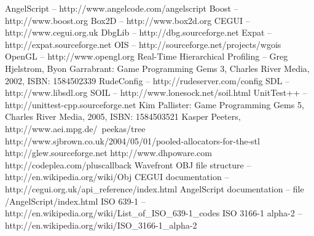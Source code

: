\documentclass[a4paper, 12pt]{report}
\begin{document}
\begin{thebibliography}{9}
AngelScript -- http://www.angelcode.com/angelscript
Boost -- http://www.boost.org
Box2D -- http://www.box2d.org
CEGUI -- http://www.cegui.org.uk
DbgLib -- http://dbg.sourceforge.net
Expat -- http://expat.sourceforge.net
OIS -- http://sourceforge.net/projects/wgois
OpenGL -- http://www.opengl.org
Real-Time Hierarchical Profiling -- Greg Hjelstrom, Byon Garrabrant: Game Programming Gems 3, Charles River Media, 2002, ISBN: 1584502339
RudeConfig -- http://rudeserver.com/config
SDL -- http://www.libsdl.org
SOIL -- http://www.lonesock.net/soil.html
UnitTest++ -- http://unittest-cpp.sourceforge.net
Kim Pallister: Game Programming Gems 5, Charles River Media, 2005, ISBN: 1584503521
Kasper Peeters, http://www.aei.mpg.de/~peekas/tree
http://www.sjbrown.co.uk/2004/05/01/pooled-allocators-for-the-stl
http://glew.sourceforge.net
http://www.dhpoware.com
http://codeplea.com/pluscallback
Wavefront OBJ file structure -- http://en.wikipedia.org/wiki/Obj
CEGUI documentation -- http://cegui.org.uk/api\_reference/index.html
AngelScript documentation -- file /AngelScript/index.html
ISO 639-1 -- http://en.wikipedia.org/wiki/List\_of\_ISO\_639-1\_codes
ISO 3166-1 alpha-2 -- http://en.wikipedia.org/wiki/ISO\_3166-1\_alpha-2
\end{thebibliography}

\clearpage
{}
\listoffigures

\clearpage
{}
\listoftables
\end{document}
